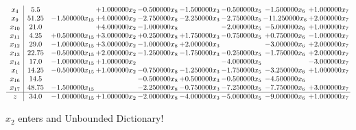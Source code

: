 \documentclass[10pt]{article}
\begin{document}
 \[\begin{array}{c| c c@{\hskip 2pt} c@{\hskip 2pt} c@{\hskip 2pt} c@{\hskip 2pt} c@{\hskip 2pt} c@{\hskip 2pt} c@{\hskip 2pt} }
 x_{4}   &  5.5  &   & + 1.000000 x_{2} & -0.500000 x_{8} & -1.500000 x_{3} & -0.500000 x_{5} & -1.500000 x_{6} & + 1.000000 x_{7}\\
 x_{9}   &  51.25 & -1.500000 x_{15} & + 4.000000 x_{2} & -2.750000 x_{8} & -2.250000 x_{3} & -2.750000 x_{5} & -11.250000 x_{6} & + 2.000000 x_{7}\\
 x_{10}   &  21.0  &   & + 4.000000 x_{2} & -1.000000 x_{8} &   & -2.000000 x_{5} & -5.000000 x_{6} & + 1.000000 x_{7}\\
 x_{11}   &  4.25 & + 0.500000 x_{15} & + 3.000000 x_{2} & + 0.250000 x_{8} & + 1.750000 x_{3} & -0.750000 x_{5} & + 0.750000 x_{6} & -1.000000 x_{7}\\
 x_{12}   &  29.0 & -1.000000 x_{15} & + 3.000000 x_{2} & -1.000000 x_{8} & + 2.000000 x_{3} &   & -3.000000 x_{6} & + 2.000000 x_{7}\\
 x_{13}   &  22.75 & -0.500000 x_{15} & + 2.000000 x_{2} & -1.250000 x_{8} & -1.750000 x_{3} & -0.250000 x_{5} & -1.750000 x_{6} & + 2.000000 x_{7}\\
 x_{14}   &  17.0 & -1.000000 x_{15} & + 1.000000 x_{2} &    &   & -4.000000 x_{5} &   & -3.000000 x_{7}\\
 x_{1}   &  14.25 & -0.500000 x_{15} & + 1.000000 x_{2} & -0.750000 x_{8} & -1.250000 x_{3} & -1.750000 x_{5} & -3.250000 x_{6} & + 1.000000 x_{7}\\
 x_{16}   &  14.5  &    &   & -0.500000 x_{8} & + 0.500000 x_{3} & -0.500000 x_{5} & -4.500000 x_{6} &   \\
 x_{17}   &  48.75 & -1.500000 x_{15} &   & -2.250000 x_{8} & -0.750000 x_{3} & -7.250000 x_{5} & -7.750000 x_{6} & + 3.000000 x_{7}\\
\hline
z    &  34.0 & -1.000000 x_{15} & + 1.000000 x_{2} & -2.000000 x_{8} & -4.000000 x_{3} & -5.000000 x_{5} & -9.000000 x_{6} & + 1.000000 x_{7}\\
\end{array}\]


 $ x_{2} $ enters and Unbounded Dictionary!
\end{document}
